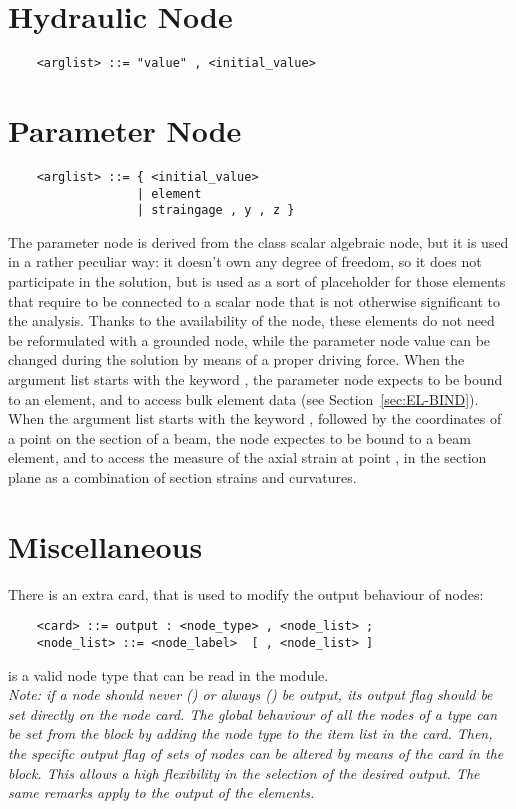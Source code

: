 \section{Hydraulic Node}
\begin{verbatim}
    <arglist> ::= "value" , <initial_value>
\end{verbatim}



\section{Parameter Node}
\begin{verbatim}
    <arglist> ::= { <initial_value>
                  | element 
                  | straingage , y , z }
\end{verbatim}
The parameter node is derived from the class scalar algebraic node, but it
is used in a rather peculiar way: it doesn't own any degree of freedom,
so it does not participate in the solution, but is used as a sort of
placeholder for those elements that require to be connected to a scalar node
that is not otherwise significant to the analysis.
Thanks to the availability of the  node, these elements
do not need be reformulated with a grounded node, while the parameter
node value can be changed during the solution by means of a proper driving 
force.
When the argument list starts with the keyword , the parameter
node expects to be bound to an element, and to access bulk element data 
(see Section~\ref{sec:EL-BIND}).
When the argument list starts with the keyword , followed by
the coordinates of a point on the section of a beam, the 
node expectes to be bound to a beam element, and to access the measure of
the axial strain at point ,  in the section plane as a
combination of section strains and curvatures.





\section{Miscellaneous}
There is an extra card, that is used to modify the output behaviour of nodes:  
\begin{verbatim}
    <card> ::= output : <node_type> , <node_list> ;
    <node_list> ::= <node_label>  [ , <node_list> ]
\end{verbatim}
 is a valid node type that can be read in the 
module. \\
{\em
   Note: if a node should never () or always () be output,
   its output flag should be set directly on the node card. 
   The global behaviour of all the nodes of a type can be set from the 
    block by adding the node type to the item list in the 
    card. 
   Then, the specific output flag of sets of nodes can be altered by means 
   of the  card in the  block. 
   This allows a high flexibility in the selection of the desired output. 
   The same remarks apply to the output of the elements.
}



